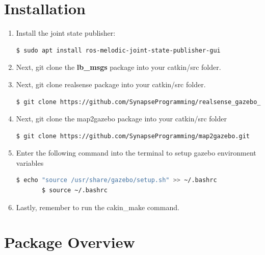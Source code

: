 \documentclass[11pt]{article}
\begin{document}
\section{Installation}
\begin{enumerate}
 \item{Install the joint state publisher:
       \begin{lstlisting}[language=bash]
$ sudo apt install ros-melodic-joint-state-publisher-gui
       \end{lstlisting}
       }
 \item {
       Next, git clone the \textbf{lb\_msgs} package into your catkin/src folder.
       }
 \item{
       Next, git clone realsense package into your catkin/src folder.
       \begin{lstlisting}[language=bash]
$ git clone https://github.com/SynapseProgramming/realsense_gazebo_plugin.git
       \end{lstlisting}
       }
       
 \item{
       Next, git clone the map2gazebo package into your catkin/src folder
       
       \begin{lstlisting}[language=bash]
$ git clone https://github.com/SynapseProgramming/map2gazebo.git
       \end{lstlisting}
       }
       
       
 \item{
       Enter the following command into the terminal to setup gazebo environment variables
       \begin{lstlisting}[language=bash]
       $ echo "source /usr/share/gazebo/setup.sh" >> ~/.bashrc
       $ source ~/.bashrc
       \end{lstlisting}
       
       }
 \item{
       Lastly, remember to run the cakin\_make command.
       }
       
\end{enumerate}

\section{Package Overview}
\end{document}
